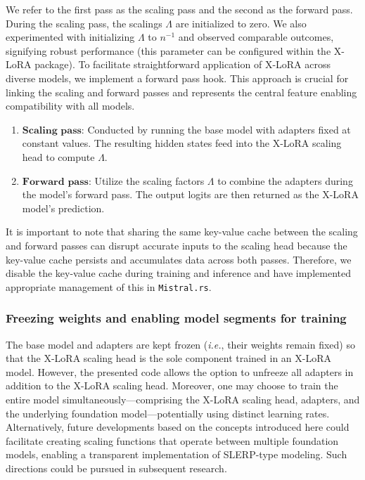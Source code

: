 We refer to the first pass as the scaling pass and the second as the forward pass. During the scaling pass, the scalings $\Lambda$ are initialized to zero. We also experimented with initializing $\Lambda$ to ${n}^{-1}$ and observed comparable outcomes, signifying robust performance (this parameter can be configured within the X-LoRA package). To facilitate straightforward application of X-LoRA across diverse models, we implement a forward pass hook. This approach is crucial for linking the scaling and forward passes and represents the central feature enabling compatibility with all models.

\begin{enumerate}
    \item $\mathbf{Scaling}$ $\mathbf{pass}$: Conducted by running the base model with adapters fixed at constant values. The resulting hidden states feed into the X-LoRA scaling head to compute $\Lambda$.
    \item $\mathbf{Forward}$ $\mathbf{pass}$: Utilize the scaling factors $\Lambda$ to combine the adapters during the model’s forward pass. The output logits are then returned as the X-LoRA model’s prediction.
\end{enumerate}

It is important to note that sharing the same key-value cache between the scaling and forward passes can disrupt accurate inputs to the scaling head because the key-value cache persists and accumulates data across both passes. Therefore, we disable the key-value cache during training and inference and have implemented appropriate management of this in \texttt{Mistral.rs}.

\subsubsection{Freezing weights and enabling model segments for training} The base model and adapters are kept frozen ({\it i.e.}, their weights remain fixed) so that the X-LoRA scaling head is the sole component trained in an X-LoRA model. However, the presented code allows the option to unfreeze all adapters in addition to the X-LoRA scaling head. Moreover, one may choose to train the entire model simultaneously—comprising the X-LoRA scaling head, adapters, and the underlying foundation model—potentially using distinct learning rates. Alternatively, future developments based on the concepts introduced here could facilitate creating scaling functions that operate between multiple foundation models, enabling a transparent implementation of SLERP-type modeling. Such directions could be pursued in subsequent research.

